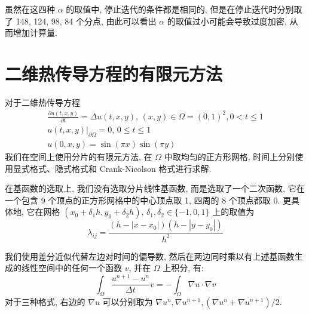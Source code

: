 \documentclass[UTF8]{article}
\begin{document}
    虽然在这四种 $\alpha$ 的取值中, 停止迭代的条件都是相同的, 但是在停止迭代时分别取了 148, 124, 98, 84 个分点, 由此可以看出 $\alpha$ 的取值过小可能会导致过度加密, 从而增加计算量.


    \section{二维热传导方程的有限元方法}

    对于二维热传导方程
    \begin{gather*}
        \frac{\partial u(t,x,y)}{\partial t} = \Delta u(t,x,y),\,(x,y)\in\Omega=(0,1)^2,0<t\le 1\\
        u(t,x,y)|_{\partial \Omega} = 0,\,0\le t \le 1\\
        u(0,x,y) = \sin(\pi x)\sin(\pi y)
    \end{gather*}
    我们在空间上使用分片的有限元方法, 在 $\Omega$ 中取均匀的正方形网格, 时间上分别使用显式格式、隐式格式和 Crank-Nicolson 格式进行求解.

    在基函数的选取上, 我们没有选取分片线性基函数, 而是选取了一个二次函数, 它在一个包含 9 个顶点的正方形网格中的中心顶点取 1, 四周的 8 个顶点都取 0.
    更具体地, 它在网格 $(x_0+\delta_1 h,y_0+\delta_2 h),\,\delta_1,\delta_2\in\{-1,0,1\}$ 上的取值为
    \[
        \lambda_{ij}=\frac{(h-| x-x_0 |)(h-| y-y_0 |)}{h^2}
    \]

    我们使用差分近似代替左边对时间的偏导数, 然后在两边同时乘以有上述基函数生成的线性空间中的任何一个函数 $v$, 并在 $\Omega$ 上积分, 有:
    \[
        \int_{\Omega} \frac{u^{n+1}-u^n}{\Delta t}v = -\int_{\Omega} \nabla u\cdot\nabla v
    \]
    对于三种格式, 右边的 $\nabla u$ 可以分别取为 $\nabla u^n, \nabla u^{n+1}, (\nabla u^n+\nabla u^{n+1})/2$.
\end{document}

